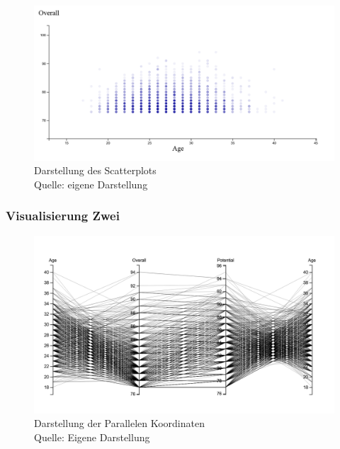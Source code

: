 \documentclass[usegeometry=true]{scrartcl}
\begin{document}
\begin{figure}[h]
\centering
\includegraphics[scale=0.4]{grafiken/Scatterplot1}
\caption{Darstellung des Scatterplots\\ Quelle: eigene Darstellung}
\end{figure}


\subsubsection{Visualisierung Zwei}

\begin{figure}[h]
\includegraphics[scale=0.25]{grafiken/ParalleleKoordinaten1}
\caption{Darstellung der Parallelen Koordinaten\\ Quelle: Eigene Darstellung}
\end{figure}
\end{document}
